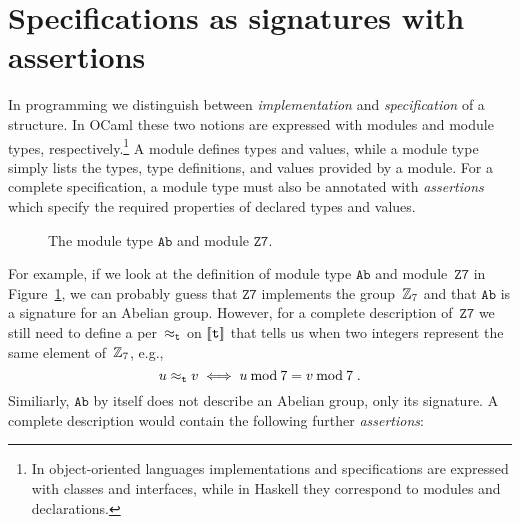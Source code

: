 \section{Specifications as signatures with assertions}
\label{sec:spec-sign-assert}


In programming we distinguish between \emph{implementation} and
\emph{specification} of a structure. In OCaml these two notions are
expressed with modules and module types, respectively.\footnote{In
  object-oriented languages implementations and specifications are
  expressed with classes and interfaces, while in Haskell they
  correspond to modules and declarations.} A module defines types and
values, while a module type simply lists the types, type definitions,
and values provided by a module. For a complete specification, a
module type must also be annotated with \emph{assertions} which
specify the required properties of declared types and values.
%
\begin{figure}
  \centering
  \caption{The module type $\mathtt{Ab}$ and module
    $\mathtt{Z7}$.}
  \label{fig:module-example}
\end{figure}
%
For example, if we look at the definition of module type $\mathtt{Ab}$
and module~$\mathtt{Z7}$ in Figure~\ref{fig:module-example}, we can
probably guess that $\mathtt{Z7}$ implements the group~$\mathbb{Z}_7$ and
that $\mathtt{Ab}$ is a signature for an Abelian group. However, for a
complete description of~$\mathtt{Z7}$ we still need to define a
per~$\approx_{\mathtt{t}}$ on $[\![\mathtt{t}]\!]$ that tells us when two
integers represent the same element of~$\mathbb{Z}_7$, e.g.,
%
\begin{equation*}
  u \approx_{\mathtt{t}} v \iff
  u \mathbin{\mathrm{mod}} 7 = v \mathbin{\mathrm{mod}} 7 \;.
\end{equation*}
%
Similiarly, $\mathtt{Ab}$ by itself does not describe an Abelian
group, only its signature. A complete description would contain the
following further \emph{assertions}:
%
